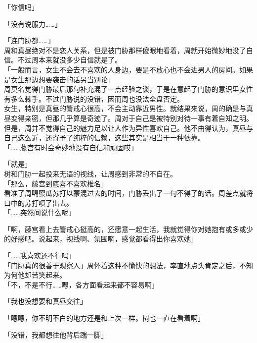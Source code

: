「你信吗」

「没有说服力……」

「连门胁都……」\\

周和真昼绝对不是恋人关系，但是被门胁那样傻眼地看着，周就开始微妙地没了自信。不过周本来就没多少自信就是了。\\

「一般而言，女生不会去不喜欢的人身边，要是不放心也不会进男人的房间。如果是女生那边想要袭击的话另当别论」\\

周莫名觉得门胁最后那句补充混了一点经验之谈，于是在意起了门胁的意识里女性有多么棘手。不过门胁说的没错，因而周也没法全盘否定。\\

女生，特别是真昼的警戒心很高，不会主动靠近男性。就结果来说，周的确是与真昼变得亲密，但那几乎算是奇迹了。周对于自己是被特别对待一事有着自知之明。\\

但是，周并不觉得自己的魅力足以让人作为异性喜欢自己。他不由得认为，真昼与自己这么近，还寄予了纯粹的信赖，这些其实是相当于一种依靠。\\

「……藤宫有时会奇妙地没有自信和顽固哎」

「就是」\\

树和门胁一起投来无语的视线，让周感到非常的不自在。\\

「那么，藤宫到底喜不喜欢椎名」\\

看准了周喝蜜瓜苏打以蒙混过去的时间，门胁丢出了一句不得了的话。周差点就将口中的苏打喷了出去。\\

「……突然间说什么呢」

「啊，藤宫看上去警戒心挺高的，还愿意一起生活，我就觉得你对她抱有或多或少的好感吧。说起来，视线啊、氛围啊，感觉都看得出你喜欢她」

「……我喜欢还不行吗」\\

「门胁真的很善于观察人」周怀着这种不愉快的想法，率直地点头肯定之后，不知为何他却苦笑起来。\\

「不，不是不行……嗯，各方面看起来都不容易啊」

「我也没想要和真昼交往」

「嗯嗯，你不明不白的地方还是和上次一样。树也一直在看着啊」

「没错，我都想往他背后踹一脚」

